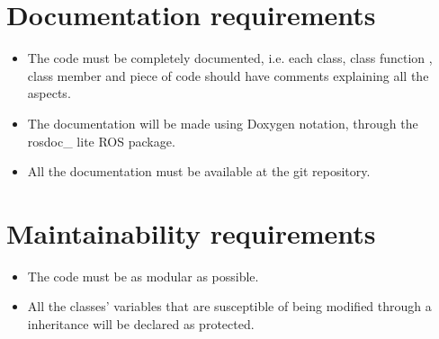 \documentclass{article}
\begin{document}

\section{Documentation requirements}
\begin{itemize}
	\item The code must be completely documented, i.e. each class, class function , class member and piece of code should have comments explaining all the aspects. 
	\item The documentation will be made using Doxygen notation, through the rosdoc\_ lite 
	ROS package. 
	\item All the documentation must be available at the git repository. 
\end{itemize}

\section{Maintainability requirements}
\begin{itemize}
	\item The code must be as modular as possible. 
	\item All the classes' variables that are susceptible of being modified through a inheritance will be declared as protected. 
	
\end{itemize}


\end{document}
